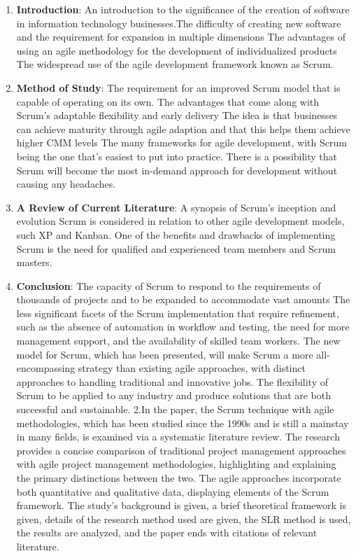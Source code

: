 \documentclass[conference]{IEEEtran}
\begin{document}
\begin{enumerate}
\item\textbf{Introduction}: An introduction to the significance of the creation of software in information technology businesses.The difficulty of creating new software and the requirement for expansion in multiple dimensions
The advantages of using an agile methodology for the development of individualized products
The widespread use of the agile development framework known as Scrum.
\item\textbf{Method of Study}:
The requirement for an improved Scrum model that is capable of operating on its own.
The advantages that come along with Scrum's adaptable flexibility and early delivery
The idea is that businesses can achieve maturity through agile adaption and that this helps them achieve higher CMM levels
The many frameworks for agile development, with Scrum being the one that's easiest to put into practice.
There is a possibility that Scrum will become the most in-demand approach for development without causing any headaches.
\item \textbf{A Review of Current Literature}:
A synopsis of Scrum's inception and evolution
Scrum is considered in relation to other agile development models, such XP and Kanban.
One of the benefits and drawbacks of implementing Scrum is the need for qualified and experienced team members and Scrum masters.
 \item \textbf{Conclusion}: 
The capacity of Scrum to respond to the requirements of thousands of projects and to be expanded to accommodate vast amounts
The less significant facets of the Scrum implementation that require refinement, such as the absence of automation in workflow and testing, the need for more management support, and the availability of skilled team workers.
The new model for Scrum, which has been presented, will make Scrum a more all-encompassing strategy than existing agile approaches, with distinct approaches to handling traditional and innovative jobs.
The flexibility of Scrum to be applied to any industry and produce solutions that are both successful and sustainable.
 \newline
 \newline
2.In the paper\cite{scrump2}, the Scrum technique with agile methodologies, which has been studied since the 1990s and is still a mainstay in many fields, is examined via a systematic literature review. The research provides a concise comparison of traditional project management approaches with agile project management methodologies, highlighting and explaining the primary distinctions between the two. The agile approaches incorporate both quantitative and qualitative data, displaying elements of the Scrum framework. The study's background is given, a brief theoretical framework is given, details of the research method used are given, the SLR method is used, the results are analyzed, and the paper ends with citations of relevant literature.

\end{enumerate}
\end{document}
